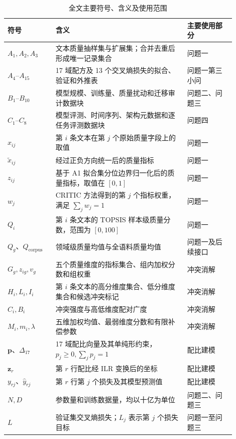 \begin{table}[htbp]
  \centering
  \caption{全文主要符号、含义及使用范围}
  \label{tab:global-notation}
  \small
  \renewcommand{\arraystretch}{1.18}
  \begin{tabular}{p{0.19\linewidth}p{0.52\linewidth}p{0.19\linewidth}}
    \toprule
    符号 & 含义 & 主要使用部分 \\
    \midrule
    $A_1,A_2,A_3$ & 文本质量抽样集与扩展集；合并去重后形成唯一记录集合 & 问题一 \\
    $A_4$--$A_{15}$ & 17 域配方及 13 个交叉熵损失的拟合、验证和外推表 & 问题一第三小问 \\
    $B_1$--$B_{10}$ & 模型规模、训练量、质量扰动和迁移审计数据块 & 问题二、问题三 \\
    $C_1$--$C_8$ & 模型评测、时间序列、架构元数据和逐任务评测数据块 & 问题四 \\
    $x_{ij}$ & 第 $i$ 条文本在第 $j$ 个原始质量字段上的取值 & 问题一 \\
    $\widetilde{x}_{ij}$ & 经过正负方向统一后的质量指标 & 问题一 \\
    $z_{ij}$ & 基于 A1 拟合集分位边界归一化后的质量指标，取值在 $[0,1]$ & 问题一 \\
    $w_j$ & CRITIC 方法得到的第 $j$ 个指标权重，满足 $\sum_jw_j=1$ & 问题一 \\
    $Q_i$ & 第 $i$ 条文本的 TOPSIS 样本级质量分数，范围为 $[0,100]$ & 问题一 \\
    $Q_g$、$Q_{\mathrm{corpus}}$ & 领域级质量均值与全语料质量均值 & 问题一及后续接口 \\
    $G_g,z_{ig},v_g$ & 五个质量维度的指标集合、组内加权分数和组权重 & 冲突消解 \\
    $H_i,L_i,I_i$ & 第 $i$ 条文本的高分维度集合、低分维度集合和候选冲突标记 & 冲突消解 \\
    $C_i,B_i$ & 冲突强度与高低维度配对广度 & 冲突消解 \\
    $M_i,m_i,\lambda$ & 五维加权均值、最弱维度分数和有限补偿参数 & 冲突消解 \\
    $\boldsymbol p$、$\Delta_{17}$ & 17 域配比向量及其单纯形约束，$p_j\ge0,\sum_jp_j=1$ & 配比建模 \\
    $\boldsymbol z_r$ & 第 $r$ 行配比经 ILR 变换后的坐标 & 配比建模 \\
    $y_{rj}$、$\widehat y_{rj}$ & 第 $r$ 行第 $j$ 个损失及其模型预测值 & 配比建模 \\
    $N,D$ & 参数量和训练数据量，均以十亿为单位 & 问题二、问题三 \\
    $L$ & 验证集交叉熵损失；$L_j$ 表示第 $j$ 个损失目标 & 问题一至问题三 \\

\end{tabular}
\end{table}
